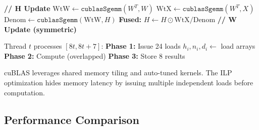 \documentclass[11pt]{article}
\begin{document}
\noindent
\begin{minipage}[t]{0.48\textwidth}
\begin{algorithm}[H]
\caption{L2: cuBLAS + Fused Kernel}
\begin{algorithmic}
\STATE \textbf{// H Update}
\STATE $\text{WtW} \leftarrow \texttt{cublasSgemm}(W^T, W)$
\STATE $\text{WtX} \leftarrow \texttt{cublasSgemm}(W^T, X)$
\STATE $\text{Denom} \leftarrow \texttt{cublasSgemm}(\text{WtW}, H)$
\STATE \textbf{Fused:} $H \leftarrow H \odot \text{WtX} / \text{Denom}$
\STATE \textbf{// W Update (symmetric)}
\end{algorithmic}
\end{algorithm}
\end{minipage}
\hfill
\begin{minipage}[t]{0.48\textwidth}
\begin{algorithm}[H]
\caption{L3: cuBLAS + 8-way ILP Kernel}
\begin{algorithmic}
\STATE Thread $t$ processes $[8t, 8t+7]$:
\STATE \textbf{Phase 1:} Issue 24 loads
    \STATE $h_i, n_i, d_i \leftarrow$ load arrays
\ENDFOR
\STATE \textbf{Phase 2:} Compute (overlapped)
\STATE \textbf{Phase 3:} Store 8 results
\end{algorithmic}
\end{algorithm}
\end{minipage}

\vspace{0.5em}
cuBLAS leverages shared memory tiling and auto-tuned kernels. The ILP optimization hides memory latency by issuing multiple independent loads before computation.

\subsection{Performance Comparison}
\end{document}
